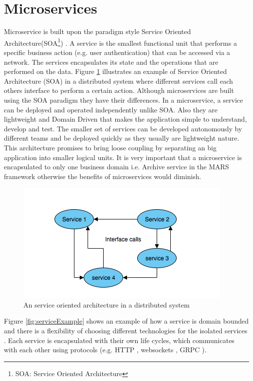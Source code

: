 \newpage
\section{Microservices}

Microservice is built upon the paradigm style Service Oriented Architecture(SOA\footnote{SOA: Service Oriented Architecture}) \cite[chapter ~3]{SOA}. A service 
is the smallest functional unit that performs a specific business action (e.g. user authentication) that can be accessed via a network. 
The services encapsulates its state and the operations that are performed on the data.  
Figure \ref{fig:objectBasedDS} illustrates an example of Service Oriented Architecture (SOA) in a distributed system where different services call each others interface
to perform a certain action. Although microservices are built using the SOA paradigm they have their differences. In a microservice, a service can be deployed and 
operated independently unlike SOA.
Also they are lightweight and Domain Driven \cite{DDD} that makes the application simple to understand, develop and test. The smaller set of services
can be developed autonomously by different teams and be deployed quickly as they usually are lightweight nature. This architecture promises to bring loose coupling 
by separating an big application into smaller logical units. It is very important that a microservice
is encapsulated to only one business domain i.e. Archive service in the MARS framework otherwise the benefits of microservices would diminish.


\begin{figure}[H]
    \centering \includegraphics[scale=0.7]{grafiken/objectBasedDS.png}
    \caption{An service oriented architecture in a distributed system 
        \cite[p.~62]{DistributedSystems}}
    \label{fig:objectBasedDS}
\end{figure}


Figure \ref{fig:serviceExample} shows an example of how 
a service is domain bounded and there is a flexibility of choosing different
technologies for the isolated services \cite{MicroserviceNewMan}. 
Each service is encapsulated with their own life cycles, which communicates with each other using protocols 
(e.g. HTTP \cite{HTTP}, websockets \cite{WebSockets}, GRPC \cite{grpc}). 

